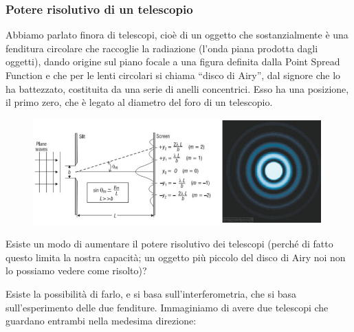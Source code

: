 \subsubsection{Potere risolutivo di un telescopio}
Abbiamo parlato finora di telescopi, cioè di un oggetto che sostanzialmente è una fenditura circolare che raccoglie la radiazione (l'onda piana prodotta dagli oggetti), dando origine sul piano focale a una figura definita dalla Point Spread Function e che per le lenti circolari si chiama “disco di Airy”, dal signore che lo ha battezzato, costituita da una serie di anelli concentrici. Esso ha una posizione, il primo zero, che è legato al diametro del foro di un telescopio.

\begin{figure}[H]
    \centering
    \includegraphics[width=12cm]{immagini/interferometria_1.png}
\end{figure}

Esiste un modo di aumentare il potere risolutivo dei telescopi (perché di fatto questo limita la nostra capacità; un oggetto più piccolo del disco di Airy noi non lo possiamo vedere come risolto)?

Esiste la possibilità di farlo, e si basa sull'interferometria, che si basa sull'esperimento delle due fenditure. Immaginiamo di avere due telescopi che guardano entrambi nella medesima direzione:

